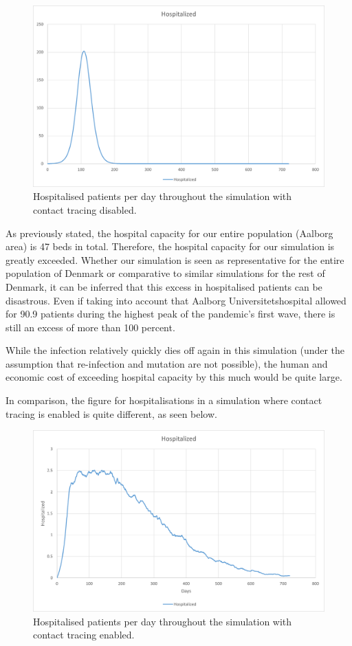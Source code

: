 \begin{figure}[H]
  \centering
  \includegraphics[width=140mm]{0_billeder/Hospitalized_no-CT.png}
  \caption{Hospitalised patients per day throughout the simulation with contact tracing disabled.}
  \label{fig:hospitalized NO CT}
\end{figure}

As previously stated, the hospital capacity for our entire population (Aalborg area) is 47 beds in total. Therefore, the hospital capacity for our simulation is greatly exceeded. Whether our simulation is seen as representative for the entire population of Denmark or comparative to similar simulations for the rest of Denmark, it can be inferred that this excess in hospitalised patients can be disastrous. Even if taking into account that Aalborg Universitetshospital allowed for 90.9 patients during the highest peak of the pandemic's first wave, there is still an excess of more than 100 percent.

While the infection relatively quickly dies off again in this simulation (under the assumption that re-infection and mutation are not possible), the human and economic cost of exceeding hospital capacity by this much would be quite large.

In comparison, the figure for hospitalisations in a simulation where contact tracing is enabled is quite different, as seen below.

\begin{figure}[H]
  \centering
  \includegraphics[width=140mm]{0_billeder/Hospitalized_WITH-CT.png}
  \caption{Hospitalised patients per day throughout the simulation with contact tracing enabled.}
  \label{fig:hospitalized WITH CT}
\end{figure}

